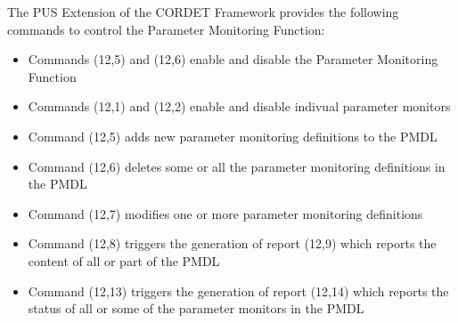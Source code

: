 \documentclass{pnp_article}
\begin{document}
The PUS Extension of the CORDET Framework provides the following commands to control the Parameter Monitoring Function:

\begin{itemize}
\item Commands (12,5) and (12,6) enable and disable the Parameter Monitoring Function
\item Commands (12,1) and (12,2) enable and disable indivual parameter monitors
\item Command (12,5) adds new parameter monitoring definitions to the PMDL
\item Command (12,6) deletes some or all the parameter monitoring definitions in the PMDL
\item Command (12,7) modifies one or more parameter monitoring definitions
\item Command (12,8) triggers the generation of report (12,9) which reports the content of all or part of the PMDL
\item Command (12,13) triggers the generation of report (12,14) which reports the status of all or some of the parameter monitors in the PMDL
\end{itemize}
\end{document}
